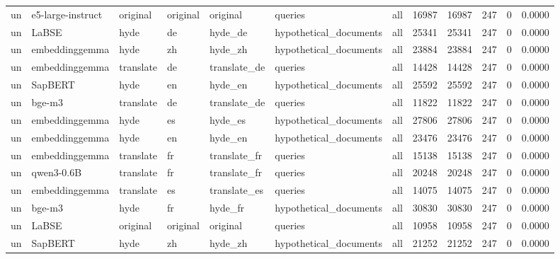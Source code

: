 \begin{tabular}{lllllllrrrrr}
un & e5-large-instruct & original & original & original & queries & all & 16987 & 16987 & 247 & 0 & 0.0000 \\
un & LaBSE & hyde & de & hyde\_de & hypothetical\_documents & all & 25341 & 25341 & 247 & 0 & 0.0000 \\
un & embeddinggemma & hyde & zh & hyde\_zh & hypothetical\_documents & all & 23884 & 23884 & 247 & 0 & 0.0000 \\
un & embeddinggemma & translate & de & translate\_de & queries & all & 14428 & 14428 & 247 & 0 & 0.0000 \\
un & SapBERT & hyde & en & hyde\_en & hypothetical\_documents & all & 25592 & 25592 & 247 & 0 & 0.0000 \\
un & bge-m3 & translate & de & translate\_de & queries & all & 11822 & 11822 & 247 & 0 & 0.0000 \\
un & embeddinggemma & hyde & es & hyde\_es & hypothetical\_documents & all & 27806 & 27806 & 247 & 0 & 0.0000 \\
un & embeddinggemma & hyde & en & hyde\_en & hypothetical\_documents & all & 23476 & 23476 & 247 & 0 & 0.0000 \\
un & embeddinggemma & translate & fr & translate\_fr & queries & all & 15138 & 15138 & 247 & 0 & 0.0000 \\
un & qwen3-0.6B & translate & fr & translate\_fr & queries & all & 20248 & 20248 & 247 & 0 & 0.0000 \\
un & embeddinggemma & translate & es & translate\_es & queries & all & 14075 & 14075 & 247 & 0 & 0.0000 \\
un & bge-m3 & hyde & fr & hyde\_fr & hypothetical\_documents & all & 30830 & 30830 & 247 & 0 & 0.0000 \\
un & LaBSE & original & original & original & queries & all & 10958 & 10958 & 247 & 0 & 0.0000 \\
un & SapBERT & hyde & zh & hyde\_zh & hypothetical\_documents & all & 21252 & 21252 & 247 & 0 & 0.0000 \\
\bottomrule
\end{tabular}
